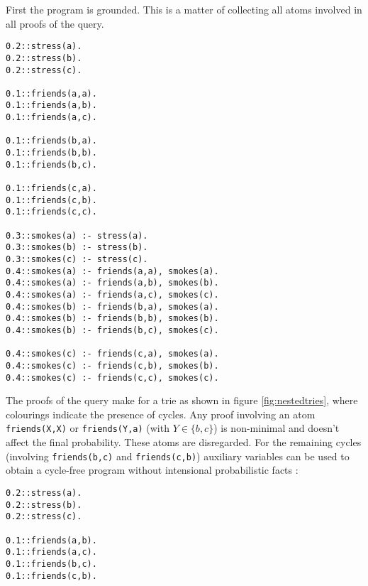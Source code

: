 \begin{multicols*}{2}
\raggedcolumns




First the program is grounded. This is a matter of collecting all atoms involved in all proofs of the query.

\begin{code}
\begin{verbatim}
0.2::stress(a).
0.2::stress(b).
0.2::stress(c).

0.1::friends(a,a).
0.1::friends(a,b).
0.1::friends(a,c).

0.1::friends(b,a).
0.1::friends(b,b).
0.1::friends(b,c).

0.1::friends(c,a).
0.1::friends(c,b).
0.1::friends(c,c).

0.3::smokes(a) :- stress(a).
0.3::smokes(b) :- stress(b).
0.3::smokes(c) :- stress(c).
0.4::smokes(a) :- friends(a,a), smokes(a).
0.4::smokes(a) :- friends(a,b), smokes(b).
0.4::smokes(a) :- friends(a,c), smokes(c).
0.4::smokes(b) :- friends(b,a), smokes(a).
0.4::smokes(b) :- friends(b,b), smokes(b).
0.4::smokes(b) :- friends(b,c), smokes(c).

0.4::smokes(c) :- friends(c,a), smokes(a).
0.4::smokes(c) :- friends(c,b), smokes(b).
0.4::smokes(c) :- friends(c,c), smokes(c).
\end{verbatim}
\label{code:base}
\vspace{0.5cm}
\end{code}

\noindent The proofs of the query make for a trie as shown in figure \ref{fig:nestedtries}, where colourings indicate the presence of cycles. Any proof involving an atom \texttt{friends(X,X)} or \texttt{friends(Y,a)} (with $Y\in\{b,c\}$) is non-minimal and doesn't affect the final probability. These atoms are disregarded. For the remaining cycles (involving \texttt{friends(b,c)} and \texttt{friends(c,b)}) auxiliary variables can be used to obtain a cycle-free program without intensional probabilistic facts :

\begin{code}
\begin{verbatim}
0.2::stress(a).
0.2::stress(b).
0.2::stress(c).

0.1::friends(a,b).
0.1::friends(a,c).
0.1::friends(b,c).
0.1::friends(c,b).


\end{verbatim}
\end{code}
\end{multicols*}

